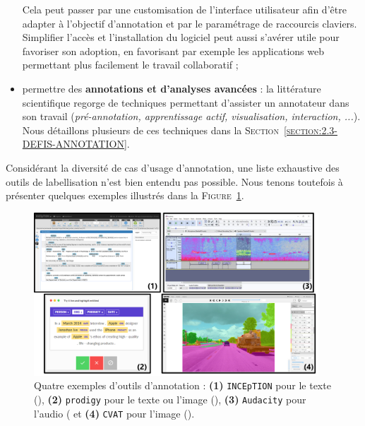 \begin{itemize}
				Cela peut passer par une customisation de l'interface utilisateur afin d'être adapter à l'objectif d'annotation et par le paramétrage de raccourcis claviers.
				Simplifier l'accès et l'installation du logiciel peut aussi s'avérer utile pour favoriser son adoption, en favorisant par exemple les applications web permettant plus facilement le travail collaboratif ;
			\item permettre des \textbf{annotations et d'analyses avancées} :
				la littérature scientifique regorge de techniques permettant d'assister un annotateur dans son travail (\textit{pré-annotation, apprentissage actif, visualisation, interaction, ...}).
				Nous détaillons plusieurs de ces techniques dans la \textsc{Section~\ref{section:2.3-DEFIS-ANNOTATION}}.
		\end{itemize}
		
		Considérant la diversité de cas d'usage d'annotation, une liste exhaustive des outils de labellisation n'est bien entendu pas possible.
		Nous tenons toutefois à présenter quelques exemples illustrés dans la \textsc{Figure~\ref{figure:2.2.3-ORGANISATION-ANNOTATION-LOGICIELS}}.
		\begin{figure}[!htb]
			\centering
			\includegraphics[width=0.95\textwidth]{figures/etatdelart-logiciel-exemples}
			\caption{
				Quatre exemples d'outils d'annotation :
				\textbf{(1)} \texttt{INCEpTION} pour le texte (\cite{klie-etal:2018:inception-platform-machineassisted}),
				\textbf{(2)} \texttt{prodigy} pour le texte ou l'image (\cite{montani-honnibal:2017:prodigy-modern-scriptable}),
				\textbf{(3)} \texttt{Audacity} pour l'audio (\cite{audacity-team:2000:audacity-free-audio}
				et \textbf{(4)} \texttt{CVAT} pour l'image (\cite{cvat.ai-corporation:2019:computer-vision-annotation}).
			}
			\label{figure:2.2.3-ORGANISATION-ANNOTATION-LOGICIELS}
		\end{figure}
		

